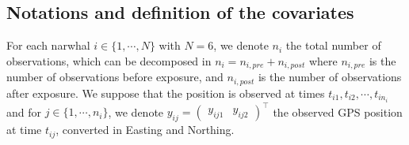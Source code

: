 \documentclass[11pt]{article}
\newcommand {\1}{\mathbb{1}}
\begin{document}
\subsection{Notations and definition of the covariates}


For each narwhal $i \in \{1,\cdots,N\}$ with $N=6$, we denote $n_i$ the total number of observations, which can be decomposed in $n_i=n_{i,pre}+n_{i,post}$ where $n_{i,pre}$ is the number of observations before exposure, and $n_{i,post}$ is the number of observations after exposure. We suppose that the position is observed at times $t_{i1}, t_{i2}, \cdots,t_{in_i}$ and  for $j \in \{1,\cdots,n_i\}$, we denote $y_{ij}=\begin{pmatrix} y_{ij1} & y_{ij2} \end{pmatrix}^\top$ the observed GPS position at time $t_{ij}$, converted in Easting and Northing.
\end{document}
